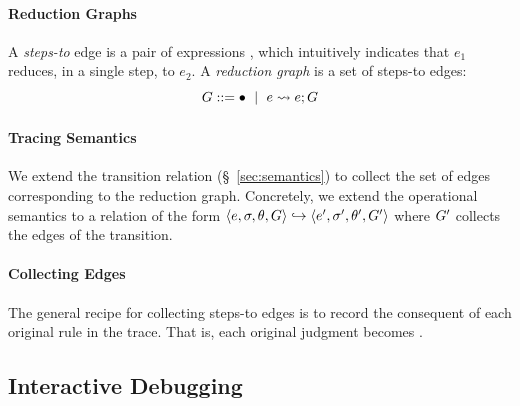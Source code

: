 \paragraph{Reduction Graphs}
%
A \emph{steps-to} edge is a pair of expressions , which
intuitively indicates that $e_1$ reduces, in a single step, to $e_2$.
%
%
A \emph{reduction graph} is a set of steps-to edges:
$$G ::= \bullet \ \mid\  e \rightsquigarrow e; G$$  %

\paragraph{Tracing Semantics}
%
We extend the transition relation (\S~\ref{sec:semantics}) to
collect the set of edges corresponding to the reduction graph.
%
Concretely, we extend the operational semantics to
a relation of the form $\langle e, \sigma, \theta, G \rangle \hookrightarrow \langle e', \sigma', \theta', G' \rangle$
where $G'$ collects the edges of the transition.

\paragraph{Collecting Edges}
%
%
The general recipe for collecting steps-to edges is
to record the consequent of each original rule in the
trace. That is, each original judgment 
becomes .
%



\subsection{Interactive Debugging}
\label{sec:traversing-graph}

